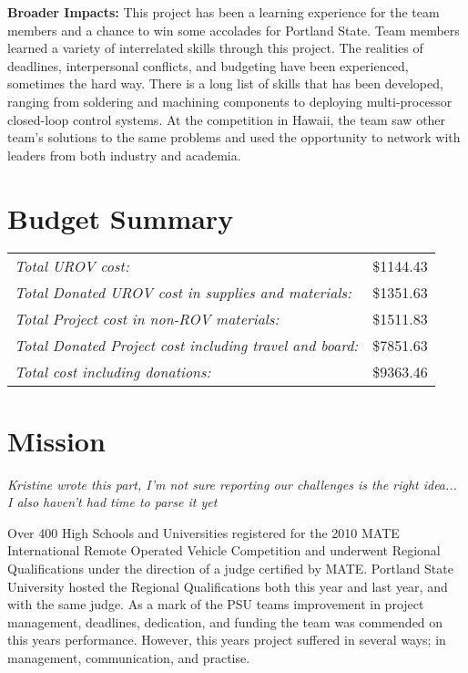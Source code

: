 \documentclass{proposalnsf}
\begin{document}
\noindent
{\bf Broader Impacts:}
This project has been a learning experience for the team members and a chance to win some accolades for Portland State. Team members learned 
a variety of interrelated skills through this project. The realities of deadlines, interpersonal conflicts, and budgeting have been experienced, 
sometimes the hard way. There is a long list of skills that has been developed, ranging from soldering and machining components to deploying 
multi-processor closed-loop control systems. At the competition in Hawaii, the team saw other team's solutions to the same problems and used the 
opportunity to network with leaders from both industry and academia. 
\renewcommand{\thepage} {B--\arabic{page}}


\section{Budget Summary}
\begin{tabular}[t]{lr}
\it Total UROV cost: &\$1144.43\\
\it Total Donated UROV cost in supplies and materials: &\$1351.63\\
\it Total Project cost in non-ROV materials: &\$1511.83\\
\it Total Donated Project cost including travel and board: &\$7851.63\\\hline
\it Total cost including donations: &\$9363.46\\
\end{tabular}


\noindent
\section{Mission}
 {\it Kristine wrote this part, I'm not sure reporting our challenges is the right idea... I also haven't had time to parse it yet}

Over 400 High Schools and Universities registered for the 2010 MATE International Remote Operated Vehicle Competition and underwent Regional Qualifications under the direction of
a judge certified by MATE.  Portland State University hosted the Regional Qualifications both this year and last year, and with the same judge.  As a mark of the PSU teams improvement
in project management, deadlines, dedication, and funding the team was commended on this years performance.  However, this years project suffered in several ways; in management, communication, and
practise.  
\end{document}
